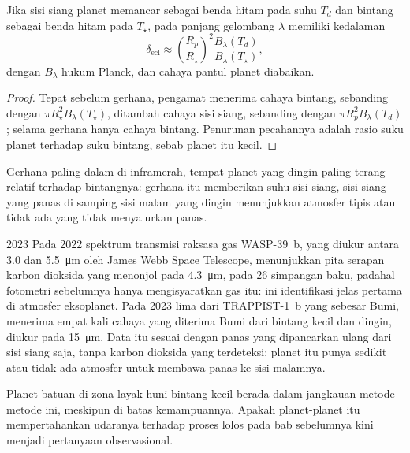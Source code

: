 \begin{proposition}\label{prop:b3:exoplanets:eclipse}
Jika sisi siang planet memancar sebagai benda hitam pada suhu
$T_d$ dan bintang sebagai benda hitam pada $T_\star$,  pada
panjang gelombang $\lambda$ memiliki kedalaman
\[
\delta_\mathrm{ecl} \approx \left(\frac{R_p}{R_\star}\right)^2
  \frac{B_\lambda(T_d)}{B_\lambda(T_\star)},
\]
dengan $B_\lambda$ hukum Planck, dan cahaya pantul planet diabaikan.
\end{proposition}

\begin{proof}
Tepat sebelum gerhana, pengamat menerima cahaya bintang, sebanding
dengan $\pi R_\star^2 B_\lambda(T_\star)$, ditambah cahaya sisi siang,
sebanding dengan $\pi R_p^2 B_\lambda(T_d)$; selama gerhana hanya
cahaya bintang. Penurunan pecahannya adalah rasio suku planet terhadap
suku bintang, sebab planet itu kecil.
\end{proof}

Gerhana paling dalam di inframerah, tempat planet yang dingin
paling terang relatif terhadap bintangnya: gerhana itu memberikan suhu sisi siang,
sisi siang yang panas di samping sisi malam yang dingin menunjukkan atmosfer
tipis atau tidak ada yang tidak menyalurkan panas.

\begin{dated}{2023}
Pada 2022 spektrum transmisi raksasa gas WASP-39~b, yang diukur
antara 3.0 dan \qty{5.5}{\micro m} oleh James Webb Space Telescope,
menunjukkan pita serapan karbon dioksida yang menonjol pada
\qty{4.3}{\micro m}, pada 26 simpangan baku, padahal fotometri sebelumnya
hanya mengisyaratkan gas itu: ini identifikasi jelas pertama di
atmosfer eksoplanet. Pada 2023 lima  dari
TRAPPIST-1~b yang sebesar Bumi, menerima empat kali cahaya yang diterima Bumi
dari bintang kecil dan dingin, diukur pada \qty{15}{\micro m}. Data itu
sesuai dengan panas yang dipancarkan ulang dari sisi siang saja, tanpa karbon
dioksida yang terdeteksi: planet itu punya sedikit atau tidak ada atmosfer untuk
membawa panas ke sisi malamnya.
\end{dated}

Planet batuan di zona layak huni bintang kecil berada
dalam jangkauan metode-metode ini, meskipun di batas kemampuannya.
Apakah planet-planet itu mempertahankan udaranya terhadap proses lolos
pada bab sebelumnya kini menjadi pertanyaan observasional.

